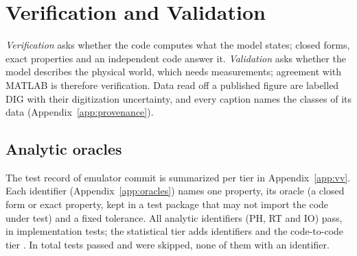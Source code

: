 \section{Verification and Validation}\label{sec:vv}

\emph{Verification} asks whether the code computes what the model states; closed forms,
exact properties and an independent code answer it. \emph{Validation} asks whether the model
describes the physical world, which needs measurements; agreement with MATLAB is therefore
verification. Data read off a published figure are labelled DIG with their digitization
uncertainty, and every caption names the classes of its data (Appendix~\ref{app:provenance}).

\subsection{Analytic oracles}\label{sec:vv-oracles}
The test record of emulator commit \txtProvTestCommit{} is summarized per
tier in Appendix~\ref{app:vv}. Each identifier (Appendix~\ref{app:oracles}) names one property,
its oracle (a closed form or exact property, kept in a test package that may not import the
code under test) and a fixed tolerance. All \numOracleCount{} analytic
identifiers (PH, RT and IO) pass, in \numOracleTests{} implementation tests; the statistical
tier adds \numStatIds{} identifiers and the code-to-code tier \numGoldenIds{}. In total
\numJunitPassed{} tests passed and \numJunitSkipped{} were skipped, none of them with an
identifier.

